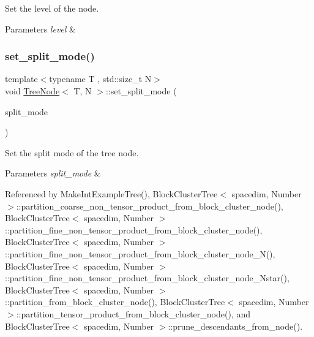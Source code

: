 Set the level of the node. 
\begin{DoxyParams}{Parameters}
{\em level} & \\
\hline
\end{DoxyParams}
\mbox{\label{classTreeNode_a0aec2b9142e931aaaa15d1c451ed9b46}} 
\subsubsection{\texorpdfstring{set\+\_\+split\+\_\+mode()}{set\_split\_mode()}}
{\footnotesize\ttfamily template$<$typename T , std\+::size\+\_\+t N$>$ \\
void \hyperlink{classTreeNode}{Tree\+Node}$<$ T, N $>$\+::set\+\_\+split\+\_\+mode (\begin{DoxyParamCaption}\item[{\hyperlink{tree_8h_a922ca07db9633957939f697a65aff11d}{Tree\+Node\+Split\+Mode}}]{split\+\_\+mode }\end{DoxyParamCaption})}

Set the split mode of the tree node. 
\begin{DoxyParams}{Parameters}
{\em split\+\_\+mode} & \\
\hline
\end{DoxyParams}


Referenced by Make\+Int\+Example\+Tree(), Block\+Cluster\+Tree$<$ spacedim, Number $>$\+::partition\+\_\+coarse\+\_\+non\+\_\+tensor\+\_\+product\+\_\+from\+\_\+block\+\_\+cluster\+\_\+node(), Block\+Cluster\+Tree$<$ spacedim, Number $>$\+::partition\+\_\+fine\+\_\+non\+\_\+tensor\+\_\+product\+\_\+from\+\_\+block\+\_\+cluster\+\_\+node(), Block\+Cluster\+Tree$<$ spacedim, Number $>$\+::partition\+\_\+fine\+\_\+non\+\_\+tensor\+\_\+product\+\_\+from\+\_\+block\+\_\+cluster\+\_\+node\+\_\+\+N(), Block\+Cluster\+Tree$<$ spacedim, Number $>$\+::partition\+\_\+fine\+\_\+non\+\_\+tensor\+\_\+product\+\_\+from\+\_\+block\+\_\+cluster\+\_\+node\+\_\+\+Nstar(), Block\+Cluster\+Tree$<$ spacedim, Number $>$\+::partition\+\_\+from\+\_\+block\+\_\+cluster\+\_\+node(), Block\+Cluster\+Tree$<$ spacedim, Number $>$\+::partition\+\_\+tensor\+\_\+product\+\_\+from\+\_\+block\+\_\+cluster\+\_\+node(), and Block\+Cluster\+Tree$<$ spacedim, Number $>$\+::prune\+\_\+descendants\+\_\+from\+\_\+node().



